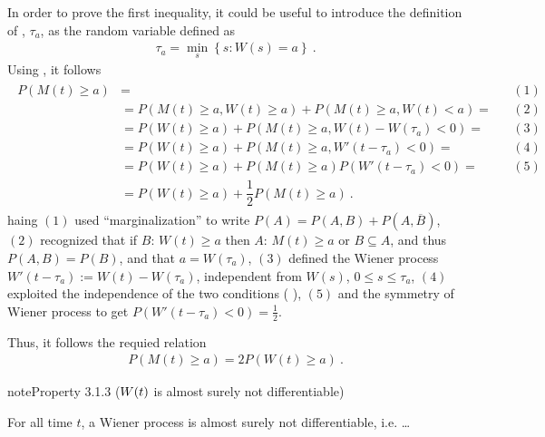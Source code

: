 \documentclass[letterpaper,10pt,english]{jupyterBook}
\begin{document}
\sphinxAtStartPar
{} In order to prove the first inequality, it could be useful to introduce the definition of , \(\tau_a\), as the random variable defined as
\begin{equation*}
\begin{split}\tau_a = \min_s \left\{ s: W(s) = a \right\} \ .\end{split}
\end{equation*}
\sphinxAtStartPar
Using , it follows
\begin{equation*}
\begin{split}\begin{aligned}
 P( M(t) \ge a ) 
 & = && (1) \\
 & = P( M(t) \ge a, W(t) \ge a) + P( M(t) \ge a,  W(t) < a) = && (2) \\
 & = P( W(t) \ge a ) + P( M(t) \ge a,  W(t) - W(\tau_a) < 0) = && (3) \\
 & = P( W(t) \ge a ) + P( M(t) \ge a,  W'(t - \tau_a) < 0) = && (4) \\
 & = P( W(t) \ge a ) + P( M(t) \ge a ) P (  W'(t - \tau_a) < 0) = && (5) \\
 & = P( W(t) \ge a ) + \dfrac{1}{2} P( M(t) \ge a ) \ .
 \end{aligned}\end{split}
\end{equation*}
\sphinxAtStartPar
haing \((1)\) used “marginalization” to write \(P(A) = P(A,B) + P(A, \overline{B})\), \((2)\) recognized that if \(B: \, W(t) \ge a\) then \(A: \, M(t) \ge a\) or \(B \subseteq A\), and thus \(P(A,B) = P(B)\), and that \(a = W(\tau_a)\), \((3)\) defined the Wiener process \(W'(t - \tau_a) := W(t) - W(\tau_a)\), independent from \(W(s)\), \(0 \le s \le \tau_a\), \((4)\) exploited the independence of the two conditions ( ), \((5)\) and the symmetry of Wiener process to get \(P(W'(t-\tau_a) < 0) = \frac{1}{2}\).

\sphinxAtStartPar
Thus, it follows the requied relation
\begin{equation*}
\begin{split}P(M(t) \ge a) = 2 P(W(t) \ge a) \ .\end{split}
\end{equation*}

\label{ch/prob/wiener:property-3}
\begin{sphinxadmonition}{note}{Property 3.1.3 (\protect\(W(t)\protect\) is almost surely not differentiable)}



\sphinxAtStartPar
For all time \(t\), a Wiener process is almost surely not differentiable, i.e. …
\end{sphinxadmonition}
\end{document}
